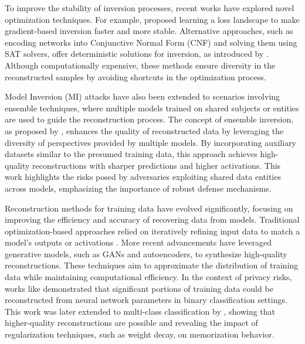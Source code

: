 To improve the stability of inversion processes, recent works have explored novel optimization techniques. For example, \cite{liu2022landscapelearningneuralnetwork} proposed learning a loss landscape to make gradient-based inversion faster and more stable. Alternative approaches, such as encoding networks into Conjunctive Normal Form (CNF) and solving them using SAT solvers, offer deterministic solutions for inversion, as introduced by \cite{suhail2024network}. Although computationally expensive, these methods ensure diversity in the reconstructed samples by avoiding shortcuts in the optimization process.

Model Inversion (MI) attacks have also been extended to scenarios involving ensemble techniques, where multiple models trained on shared subjects or entities are used to guide the reconstruction process. The concept of ensemble inversion, as proposed by \cite{wang2021reconstructingtrainingdatadiverse}, enhances the quality of reconstructed data by leveraging the diversity of perspectives provided by multiple models. By incorporating auxiliary datasets similar to the presumed training data, this approach achieves high-quality reconstructions with sharper predictions and higher activations. This work highlights the risks posed by adversaries exploiting shared data entities across models, emphasizing the importance of robust defense mechanisms.

Reconstruction methods for training data have evolved significantly, focusing on improving the efficiency and accuracy of recovering data from models. Traditional optimization-based approaches relied on iteratively refining input data to match a model’s outputs or activations \cite{Wong2017NeuralNI}. More recent advancements have leveraged generative models, such as GANs and autoencoders, to synthesize high-quality reconstructions. These techniques aim to approximate the distribution of training data while maintaining computational efficiency. In the context of privacy risks, works like \cite{haim2022reconstructingtrainingdatatrained} demonstrated that significant portions of training data could be reconstructed from neural network parameters in binary classification settings. This work was later extended to multi-class classification by \cite{buzaglo2023reconstructingtrainingdatamulticlass}, showing that higher-quality reconstructions are possible and revealing the impact of regularization techniques, such as weight decay, on memorization behavior.

